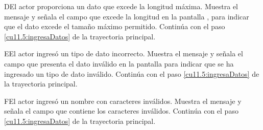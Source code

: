  \begin{UCtrayectoriaA}{D}{El actor proporciona un dato que excede la longitud máxima.}
    \UCpaso[\UCsist] Muestra el mensaje  y señala el campo que excede la 
    longitud en la pantalla , para indicar que el dato excede el tamaño máximo permitido.
    \UCpaso[] Continúa con el paso \ref{cu11.5:ingresaDatos} de la trayectoria principal.
 \end{UCtrayectoriaA}
 \begin{UCtrayectoriaA}{E}{El actor ingresó un tipo de dato incorrecto.}
    \UCpaso[\UCsist] Muestra el mensaje  y señala el campo que presenta el dato inválido en la 
    pantalla  para indicar que se ha ingresado un tipo de dato inválido.
    \UCpaso[] Continúa con el paso \ref{cu11.5:ingresaDatos} de la trayectoria principal.
 \end{UCtrayectoriaA}
 \begin{UCtrayectoriaA}{F}{El actor ingresó un nombre con caracteres inválidos.}
    \UCpaso[\UCsist] Muestra el mensaje  y señala el campo que contiene los caracteres inválidos.
    \UCpaso[] Continúa con el paso \ref{cu11.5:ingresaDatos} de la trayectoria principal.
 \end{UCtrayectoriaA}
